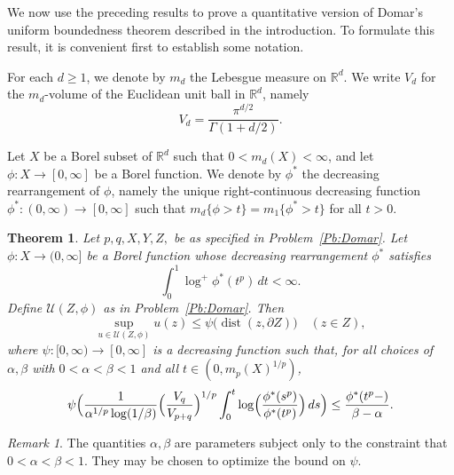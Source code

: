 \documentclass[11pt,reqno]{amsart}
\theoremstyle{plain}
\newtheorem{theorem}{Theorem}[section]
\theoremstyle{definition}
\theoremstyle{remark}
\newtheorem*{remark}{Remark}
\newcommand{\cU}{\mathcal{U}}
\newcommand{\RR}{\mathbb{R}}
\DeclareMathOperator{\dist}{dist}
\begin{document}
We now use the preceding results  to  prove a quantitative version of Domar's uniform boundedness
theorem described in the introduction. To formulate this result, it is convenient first to
establish some notation.

For each $d\ge1$, we denote by $m_d$ the Lebesgue measure on $\RR^d$.
We write $V_d$ for the $m_d$-volume of the Euclidean unit ball in $\RR^d$,
namely 
\[
V_d=\frac{\pi^{d/2}}{\Gamma(1+d/2)}.
\]

Let $X$ be a  Borel subset of $\RR^d$ such that
 $0<m_d(X)<\infty$,
and let $\phi:X\to[0,\infty]$ be a Borel function.
We denote by $\phi^*$
the decreasing rearrangement of $\phi$, 
namely the unique right-continuous  decreasing function 
$\phi^*:(0,\infty)\to[0,\infty]$ such that 
$m_d\{\phi>t\}=m_1\{\phi^*>t\}$
for all $t>0$.


\begin{theorem}\label{T:Domar}
Let $p,q,X,Y,Z,$ be as specified in Problem~\ref{Pb:Domar}.
Let $\phi:X\to(0,\infty]$ be a Borel function whose decreasing rearrangement $\phi^*$ satisfies
\begin{equation}\label{E:phiint}
 \int_0^1 \log^+\phi^*(t^p)\,dt<\infty.
\end{equation}
Define $\cU(Z,\phi)$ as in Problem~\ref{Pb:Domar}. Then
\begin{equation}\label{E:Ubound}
\sup_{u\in\cU(Z,\phi)}u(z)\le \psi\bigl(\dist(z,\partial Z)\bigr) \quad(z\in Z),
\end{equation}
where $\psi:[0,\infty)\to[0,\infty]$ is a decreasing function such that,
for all choices of $\alpha,\beta$ with $0<\alpha<\beta<1$
and all $t\in(0,m_p(X)^{1/p})$,
\begin{equation}\label{E:Domarineq}
\psi\Bigl(\frac{1}{\alpha^{1/p}\log(1/\beta)}\Bigl(\frac{V_q}{V_{p+q}}\Bigr)^{1/p}
\int_0^t \log\Bigl(\frac{\phi^*(s^p)}{\phi^*(t^p)}\Bigr)\,ds\Bigr)
\le \frac{\phi^*(t^p-)}{\beta-\alpha}.
\end{equation}
\end{theorem}

\begin{remark}
The quantities $\alpha,\beta$ are parameters subject only to the constraint that $0<\alpha<\beta<1$.
They may be chosen to optimize the bound on $\psi$.
\end{remark}
\end{document}
